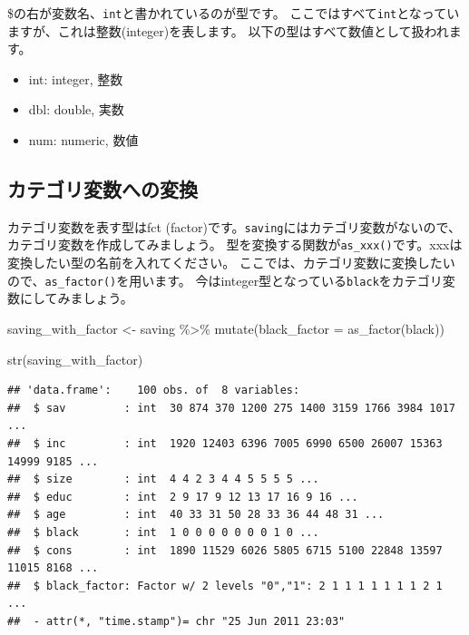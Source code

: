 \documentclass[
]{book}
\newenvironment{Shaded}{\begin{snugshade}}{\end{snugshade}}
\newcommand{\AttributeTok}[1]{\textcolor[rgb]{0.77,0.63,0.00}{#1}}
\newcommand{\FunctionTok}[1]{\textcolor[rgb]{0.00,0.00,0.00}{#1}}
\newcommand{\NormalTok}[1]{#1}
\newcommand{\OtherTok}[1]{\textcolor[rgb]{0.56,0.35,0.01}{#1}}
\newcommand{\SpecialCharTok}[1]{\textcolor[rgb]{0.00,0.00,0.00}{#1}}
\providecommand{\tightlist}{%
  \setlength{\itemsep}{0pt}\setlength{\parskip}{0pt}}
\begin{document}
\$の右が変数名、\texttt{int}と書かれているのが型です。
ここではすべて\texttt{int}となっていますが、これは整数(integer)を表します。
以下の型はすべて数値として扱われます。

\begin{itemize}
\tightlist
\item
  int: integer, 整数
\item
  dbl: double, 実数
\item
  num: numeric, 数値
\end{itemize}

\hypertarget{ux30abux30c6ux30b4ux30eaux5909ux6570ux3078ux306eux5909ux63db}{%
\subsection{カテゴリ変数への変換}\label{ux30abux30c6ux30b4ux30eaux5909ux6570ux3078ux306eux5909ux63db}}

カテゴリ変数を表す型はfct (factor)です。\texttt{saving}にはカテゴリ変数がないので、カテゴリ変数を作成してみましょう。
型を変換する関数が\texttt{as\_xxx()}です。xxxは変換したい型の名前を入れてください。
ここでは、カテゴリ変数に変換したいので、\texttt{as\_factor()}を用います。
今はinteger型となっている\texttt{black}をカテゴリ変数にしてみましょう。

\begin{Shaded}
\begin{Highlighting}[]
\NormalTok{saving\_with\_factor }\OtherTok{\textless{}{-}}
\NormalTok{  saving }\SpecialCharTok{\%\textgreater{}\%}
    \FunctionTok{mutate}\NormalTok{(}\AttributeTok{black\_factor =} \FunctionTok{as\_factor}\NormalTok{(black))}

\FunctionTok{str}\NormalTok{(saving\_with\_factor)}
\end{Highlighting}
\end{Shaded}

\begin{verbatim}
## 'data.frame':    100 obs. of  8 variables:
##  $ sav         : int  30 874 370 1200 275 1400 3159 1766 3984 1017 ...
##  $ inc         : int  1920 12403 6396 7005 6990 6500 26007 15363 14999 9185 ...
##  $ size        : int  4 4 2 3 4 4 5 5 5 5 ...
##  $ educ        : int  2 9 17 9 12 13 17 16 9 16 ...
##  $ age         : int  40 33 31 50 28 33 36 44 48 31 ...
##  $ black       : int  1 0 0 0 0 0 0 0 1 0 ...
##  $ cons        : int  1890 11529 6026 5805 6715 5100 22848 13597 11015 8168 ...
##  $ black_factor: Factor w/ 2 levels "0","1": 2 1 1 1 1 1 1 1 2 1 ...
##  - attr(*, "time.stamp")= chr "25 Jun 2011 23:03"
\end{verbatim}
\end{document}
